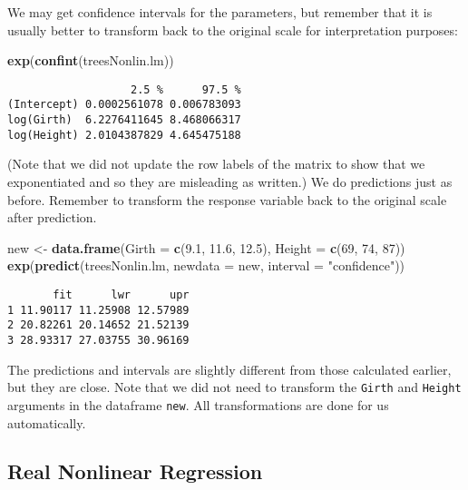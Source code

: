 \documentclass[]{book}
\newenvironment{Shaded}{\begin{snugshade}}{\end{snugshade}}
\newcommand{\KeywordTok}[1]{\textcolor[rgb]{0.13,0.29,0.53}{\textbf{{#1}}}}
\newcommand{\DataTypeTok}[1]{\textcolor[rgb]{0.13,0.29,0.53}{{#1}}}
\newcommand{\DecValTok}[1]{\textcolor[rgb]{0.00,0.00,0.81}{{#1}}}
\newcommand{\FloatTok}[1]{\textcolor[rgb]{0.00,0.00,0.81}{{#1}}}
\newcommand{\StringTok}[1]{\textcolor[rgb]{0.31,0.60,0.02}{{#1}}}
\newcommand{\NormalTok}[1]{{#1}}
\numberwithin{equation}{chapter}
\numberwithin{figure}{chapter}
\theoremstyle{plain}
\theoremstyle{definition}
\theoremstyle{remark}
\theoremstyle{definition}
\theoremstyle{definition}
\theoremstyle{remark}
\begin{document}
We may get confidence intervals for the parameters, but remember that it
is usually better to transform back to the original scale for
interpretation purposes:

\begin{Shaded}
\begin{Highlighting}[]
\KeywordTok{exp}\NormalTok{(}\KeywordTok{confint}\NormalTok{(treesNonlin.lm))}
\end{Highlighting}
\end{Shaded}

\begin{verbatim}
                   2.5 %      97.5 %
(Intercept) 0.0002561078 0.006783093
log(Girth)  6.2276411645 8.468066317
log(Height) 2.0104387829 4.645475188
\end{verbatim}

(Note that we did not update the row labels of the matrix to show that
we exponentiated and so they are misleading as written.) We do
predictions just as before. Remember to transform the response variable
back to the original scale after prediction.

\begin{Shaded}
\begin{Highlighting}[]
\NormalTok{new <-}\StringTok{ }\KeywordTok{data.frame}\NormalTok{(}\DataTypeTok{Girth =} \KeywordTok{c}\NormalTok{(}\FloatTok{9.1}\NormalTok{, }\FloatTok{11.6}\NormalTok{, }\FloatTok{12.5}\NormalTok{), }\DataTypeTok{Height =} \KeywordTok{c}\NormalTok{(}\DecValTok{69}\NormalTok{, }\DecValTok{74}\NormalTok{, }\DecValTok{87}\NormalTok{))}
\KeywordTok{exp}\NormalTok{(}\KeywordTok{predict}\NormalTok{(treesNonlin.lm, }\DataTypeTok{newdata =} \NormalTok{new, }\DataTypeTok{interval =} \StringTok{"confidence"}\NormalTok{))}
\end{Highlighting}
\end{Shaded}

\begin{verbatim}
       fit      lwr      upr
1 11.90117 11.25908 12.57989
2 20.82261 20.14652 21.52139
3 28.93317 27.03755 30.96169
\end{verbatim}

The predictions and intervals are slightly different from those
calculated earlier, but they are close. Note that we did not need to
transform the \texttt{Girth} and \texttt{Height} arguments in the
dataframe \texttt{new}. All transformations are done for us
automatically.

\subsection{Real Nonlinear Regression}\label{real-nonlinear-regression}
\end{document}

